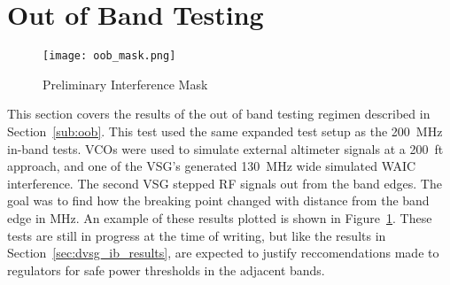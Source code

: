 \section{Out of Band Testing}\label{sec:dvsg_oob_results}
 \begin{figure}[h!]
	\centering
	\texttt{[image: oob\_mask.png]}
	\caption{Preliminary Interference Mask}
	\label{fig:oob_mask}
\end{figure}

This section covers the results of the out of band testing regimen described in Section~\ref{sub:oob}. This test used the same expanded test setup as the 200~MHz in-band tests. VCOs were used to simulate external altimeter signals at a 200~ft approach, and one of the VSG's generated 130~MHz wide simulated WAIC interference. The second VSG stepped RF signals out from the band edges. The goal was to find how the breaking point changed with distance from the band edge in MHz. An example of these results plotted is shown in Figure~\ref{fig:oob_mask}. These tests are still in progress at the time of writing, but like the results in Section~\ref{sec:dvsg_ib_results}, are expected to justify reccomendations made to regulators for safe power thresholds in the adjacent bands. 

